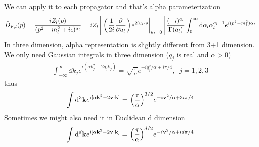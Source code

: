 \documentclass[aps,prd,preprint,showkeys,10pt]{revtex4-1}
\newcommand{\vbk}{\vb{k}}
\renewcommand{\a}{\alpha}
\begin{document}
	We can apply it to each propagator and that's alpha parameterization\cite{Smirnov2006}
	\begin{align}
		\tilde D_{F,l}(p)=\frac{iZ_l(p)}{(p^2-m_l^2+i\epsilon)^{a_l}}=iZ_l\bqty{\eval{\pqty{\frac{1}{2i}\pdv{u_l}}e^{2iu_l\cdot p}}_{u_l=0}}\frac{(-i)^{a_l}}{\Gamma{(a_l)}}\int_0^{\infty}\dd \a_l \a_l^{a_l-1}e^{i(p^2-m_l^2)\a_l}
		\label{ALPHAPARA}
	\end{align}
	In three dimension, alpha representation is slightly different from 3+1 dimension. We only need Gaussian integrals in three dimension ($q_j$ is real and $\a>0$)
	\begin{align}
		\int_{-\infty}^{\infty}\dd k_je^{i(\a k_j^2-2q_jk_j)}=\sqrt{\frac{\pi}{\a}}e^{-iq_j^2/\a+i\pi/4},\;\;j=1,2,3
	\end{align}
	thus
	\begin{align}
		\int\dd^3\vbk e^{i[\a \vbk^2-2 \vb{v}\cdot \vbk]}=\pqty{\frac{\pi}{\a}}^{3/2}e^{-i\vb{v}^2/\a+3i\pi/4}
	\end{align}
	Sometimes we might also need it in Euclidean d dimension
	\begin{align}
		\int\dd^d\vbk e^{i[\a \vbk^2-2 \vb{v}\cdot \vbk]}=\pqty{\frac{\pi}{\a}}^{d/2}e^{-i\vb{v}^2/\a+id\pi/4}
	\end{align}
\end{document}
